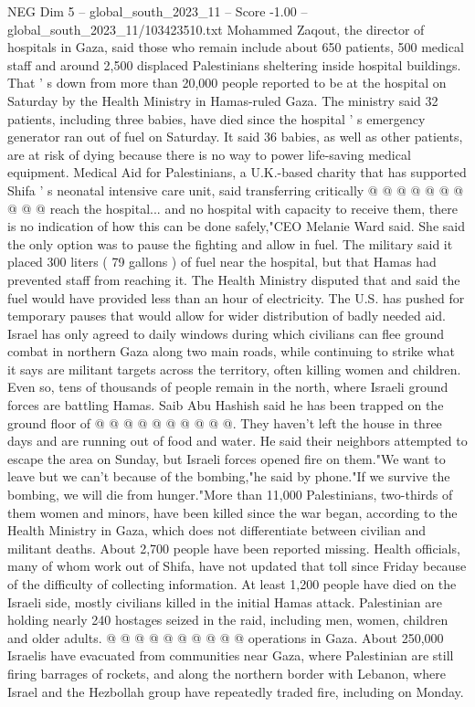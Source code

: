 \begin{textsample}{NEG Dim 5 – global\_south\_2023\_11 – Score -1.00 – global\_south\_2023\_11/103423510.txt}
Mohammed Zaqout, the director of hospitals in Gaza, said those who remain include about 650 patients, 500 medical staff and around 2,500 displaced Palestinians sheltering inside hospital buildings.
That ' s down from more than 20,000 people reported to be at the hospital on Saturday by the Health Ministry in Hamas-ruled Gaza.
The ministry said 32 patients, including three babies, have died since the hospital ' s emergency generator ran out of fuel on Saturday.
It said 36 babies, as well as other patients, are at risk of dying because there is no way to power life-saving medical equipment.
Medical Aid for Palestinians, a U.K.-based charity that has supported Shifa ' s neonatal intensive care unit, said transferring critically @ @ @ @ @ @ @ @ @ @ reach the hospital... and no hospital with capacity to receive them, there is no indication of how this can be done safely,"CEO Melanie Ward said.
She said the only option was to pause the fighting and allow in fuel.
The military said it placed 300 liters ( 79 gallons ) of fuel near the hospital, but that Hamas had prevented staff from reaching it.
The Health Ministry disputed that and said the fuel would have provided less than an hour of electricity.
The U.S. has pushed for temporary pauses that would allow for wider distribution of badly needed aid.
Israel has only agreed to daily windows during which civilians can flee ground combat in northern Gaza along two main roads, while continuing to strike what it says are militant targets across the territory, often killing women and children.
Even so, tens of thousands of people remain in the north, where Israeli ground forces are battling Hamas.
Saib Abu Hashish said he has been trapped on the ground floor of @ @ @ @ @ @ @ @ @ @.
They haven't left the house in three days and are running out of food and water.
He said their neighbors attempted to escape the area on Sunday, but Israeli forces opened fire on them."We want to leave but we can't because of the bombing,"he said by phone."If we survive the bombing, we will die from hunger."More than 11,000 Palestinians, two-thirds of them women and minors, have been killed since the war began, according to the Health Ministry in Gaza, which does not differentiate between civilian and militant deaths.
About 2,700 people have been reported missing.
Health officials, many of whom work out of Shifa, have not updated that toll since Friday because of the difficulty of collecting information.
At least 1,200 people have died on the Israeli side, mostly civilians killed in the initial Hamas attack.
Palestinian are holding nearly 240 hostages seized in the raid, including men, women, children and older adults. @ @ @ @ @ @ @ @ @ @ operations in Gaza.
About 250,000 Israelis have evacuated from communities near Gaza, where Palestinian are still firing barrages of rockets, and along the northern border with Lebanon, where Israel and the Hezbollah group have repeatedly traded fire, including on Monday.

\end{textsample}
